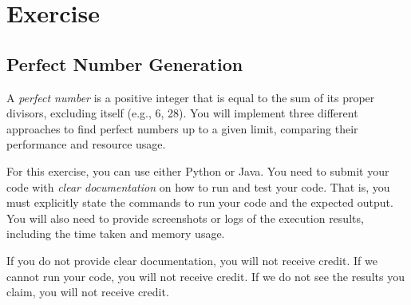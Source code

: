 \documentclass[oneside,11pt,dvipsnames]{book}
\begin{document}



\section{Exercise}
\subsection{Perfect Number Generation}

A \emph{perfect number} is a positive integer that is equal to the sum of its proper divisors, excluding itself (e.g., 6, 28). You will implement three different approaches to find perfect numbers up to a given limit, comparing their performance and resource usage.  

For this exercise, you can use either Python or Java. You need to submit your code with \emph{clear documentation} on how to run and test your code. That is, you must explicitly state the commands to run your code and the expected output. You will also need to provide screenshots or logs of the execution results, including the time taken and memory usage.  

If you do not provide clear documentation, you will not receive credit. If we cannot run your code, you will not receive credit. If we do not see the results you claim, you will not receive credit. 
\end{document}
